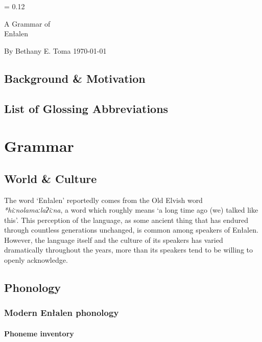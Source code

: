 \documentclass[a4paper,11pt,oneside,openany]{memoir}
\newcommand{\proto}[1]{\textit{*#1}}
\newlength{\drop}%
\newcommand*{\titleP}{\begingroup%
\drop = 0.12\textheight
\vspace*{\drop}
\begin{center}
{\huge A Grammar of}\\[\baselineskip]
{\HUGE\sc \lang}\par
\end{center}
\vspace*{3\drop}
{\large By {\sc Bethany E. Toma}}
\vfill
{\today}
\vspace*{0.5\drop}
\endgroup}
\newcommand{\lang}{Enłalen}
\newcommand{\parentlang}{Old Elvish}
\begin{document}
\begin{titlingpage}
\titleP
\end{titlingpage}
\frontmatter

\chapter{Background \& Motivation}
\clearpage
\tableofcontents

\chapter{List of Glossing Abbreviations}

\mainmatter

\part{Grammar}

\chapter{World \& Culture}

The word `\lang{}' reportedly comes from the \parentlang{} word \proto{hiːnolamaːlaʔiːna}, a word which roughly means `a long time ago (we) talked like this'. This perception of the language, as some ancient thing that has endured through countless generations unchanged, is common among speakers of \lang{}. However, the language itself and the culture of its speakers has varied dramatically throughout the years, more than its speakers tend to be willing to openly acknowledge.

\chapter{Phonology}

\section{Modern \lang{} phonology}

\subsection{Phoneme inventory}
\end{document}
